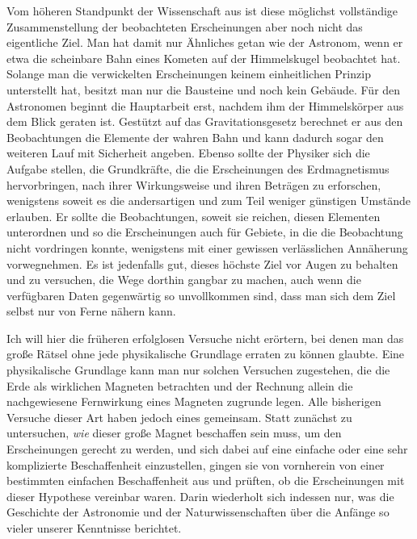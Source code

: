 Vom höheren Standpunkt der Wissenschaft aus ist diese möglichst vollständige Zusammenstellung der beobachteten Erscheinungen aber noch nicht das eigentliche Ziel. Man hat damit nur Ähnliches getan wie der Astronom, wenn er etwa die scheinbare Bahn eines Kometen auf der Himmelskugel beobachtet hat. Solange man die verwickelten Erscheinungen keinem einheitlichen Prinzip unterstellt hat, besitzt man nur die Bausteine und noch kein Gebäude. Für den Astronomen beginnt die Hauptarbeit erst, nachdem ihm der Himmelskörper aus dem Blick geraten ist. Gestützt auf das Gravitationsgesetz berechnet er aus den Beobachtungen die Elemente der wahren Bahn und kann dadurch sogar den weiteren Lauf mit Sicherheit angeben. Ebenso sollte der Physiker sich die Aufgabe stellen, die Grundkräfte, die die Erscheinungen des Erdmagnetismus hervorbringen, nach ihrer Wirkungsweise und ihren Beträgen zu erforschen, wenigstens soweit es die andersartigen und zum Teil weniger günstigen Umstände erlauben. Er sollte die Beobachtungen, soweit sie reichen, diesen Elementen unterordnen und so die Erscheinungen auch für Gebiete, in die die Beobachtung nicht vordringen konnte, wenigstens mit einer gewissen verlässlichen Annäherung vorwegnehmen. Es ist jedenfalls gut, dieses höchste Ziel vor Augen zu behalten und zu versuchen, die Wege dorthin gangbar zu machen, auch wenn die verfügbaren Daten gegenwärtig so unvollkommen sind, dass man sich dem Ziel selbst nur von Ferne nähern kann.

Ich will hier die früheren erfolglosen Versuche nicht erörtern, bei denen man das große Rätsel ohne jede physikalische Grundlage erraten zu können glaubte. Eine physikalische Grundlage kann man nur solchen Versuchen zugestehen, die die Erde als wirklichen Magneten betrachten und der Rechnung allein die nachgewiesene Fernwirkung eines Magneten zugrunde legen. Alle bisherigen Versuche dieser Art haben jedoch eines gemeinsam. Statt zunächst zu untersuchen, \textit{wie} dieser große Magnet beschaffen sein muss, um den Erscheinungen gerecht zu werden, und sich dabei auf eine einfache oder eine sehr komplizierte Beschaffenheit einzustellen, gingen sie von vornherein von einer bestimmten einfachen Beschaffenheit aus und prüften, ob die Erscheinungen mit dieser Hypothese vereinbar waren. Darin wiederholt sich indessen nur, was die Geschichte der Astronomie und der Naturwissenschaften über die Anfänge so vieler unserer Kenntnisse berichtet.

